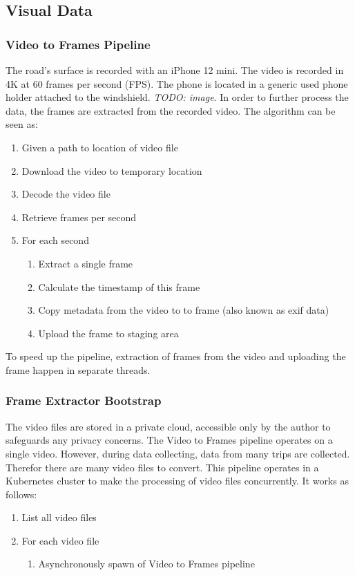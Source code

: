 \subsection{Visual Data}


\subsubsection{Video to Frames Pipeline}
The road's surface is recorded with an iPhone 12 mini. The video is recorded in 4K at 60 frames per second (FPS). The phone is located in a generic used phone holder attached to the windshield. \textit{TODO: image}. In order to further process the data, the frames are extracted from the recorded video. The algorithm can be seen as:
\begin{enumerate}
\item Given a path to location of video file
\item Download the video to temporary location
\item Decode the video file
\item Retrieve frames per second
\item For each second
\begin{enumerate}
\item Extract a single frame
\item Calculate the timestamp of this frame
\item Copy metadata from the video to to frame (also known as exif data)
\item Upload the frame to staging area
\end{enumerate}

\end{enumerate}
To speed up the pipeline, extraction of frames from the video and uploading the frame happen in separate threads. 


\subsubsection{Frame Extractor Bootstrap}
The video files are stored in a private cloud, accessible only by the author to safeguards any privacy concerns. The Video to Frames pipeline operates on a single video. However, during data collecting, data from many trips are collected. Therefor there are many video files to convert. This pipeline operates in a Kubernetes cluster to make the processing of video files concurrently. It works as follows:
\begin{enumerate}
\item List all video files 
\item For each video file
\begin{enumerate}
\item Asynchronously spawn of Video to Frames pipeline
\end{enumerate}
\end{enumerate}


